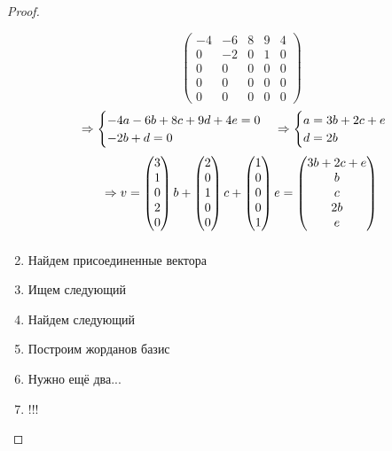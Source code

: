 \documentclass[11pt, fleqn]{article}
\begin{document}
\begin{proof}
\begin{enumerate}
\[\begin{pmatrix}
      -4 & -6 & 8 & 9 & 4\\
      0 & -2 & 0 & 1 & 0\\
      0 & 0 & 0 & 0 & 0\\
      0 & 0 & 0 & 0 & 0\\
      0 & 0 & 0 & 0 & 0
    \end{pmatrix}\]
    \[\Rightarrow \begin{cases}
      -4a - 6b + 8c + 9d + 4e = 0\\
      -2b + d = 0
    \end{cases} \Rightarrow \begin{cases}
      a = 3b + 2c + e\\
      d = 2b
    \end{cases}\]
    \[\Rightarrow v = \begin{pmatrix}
      3\\
      1\\
      0\\
      2\\
      0\\
    \end{pmatrix}b + \begin{pmatrix}
      2\\
      0\\
      1\\
      0\\
      0
    \end{pmatrix} c + \begin{pmatrix}
      1\\
      0\\
      0\\
      0\\
      1
    \end{pmatrix}e = \begin{pmatrix}
      3b + 2c + e\\
      b\\
      c\\
      2b\\
      e
    \end{pmatrix}\]
    \[\]
    \item Найдем присоединенные вектора
    \item Ищем следующий
    \item Найдем следующий
    \item Построим жорданов базис
    \item Нужно ещё два...
    \item !!!
  \end{enumerate}
\end{proof}
\end{document}
